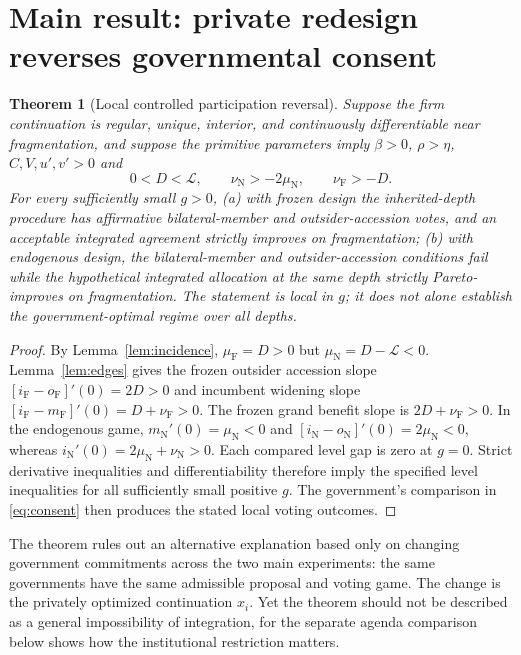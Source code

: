 \documentclass[11pt,a4paper]{article}
\newtheorem{theorem}{Theorem}
\theoremstyle{remark}\newtheorem{remark}[theorem]{Remark}
\newcommand{\N}{\mathrm{N}}\newcommand{\F}{\mathrm{F}}
\newcommand{\loss}{\mathcal L}\newcommand{\vect}[1]{\boldsymbol{#1}}
\begin{document}
\section{Main result: private redesign reverses governmental consent}\label{sec:global}
\begin{theorem}[Local controlled participation reversal]\label{thm:local}
Suppose the firm continuation is regular, unique, interior, and continuously differentiable near fragmentation, and suppose the primitive parameters imply $\beta>0$, $\rho>\eta$, $C,V,u',v'>0$ and
\begin{equation}\label{eq:conditions}
0<D<\loss,\qquad \nu_{\N}>-2\mu_{\N},\qquad \nu_{\F}>-D.
\end{equation}
For every sufficiently small $g>0$, (a) with frozen design the inherited-depth procedure has affirmative bilateral-member and outsider-accession votes, and an acceptable integrated agreement strictly improves on fragmentation; (b) with endogenous design, the bilateral-member and outsider-accession conditions fail while the hypothetical integrated allocation at the same depth strictly Pareto-improves on fragmentation. The statement is local in $g$; it does not alone establish the government-optimal regime over all depths.
\end{theorem}
\begin{proof}
By Lemma~\ref{lem:incidence}, $\mu_{\F}=D>0$ but $\mu_{\N}=D-\loss<0$. Lemma~\ref{lem:edges} gives the frozen outsider accession slope $[i_{\F}-o_{\F}]'(0)=2D>0$ and incumbent widening slope $[i_{\F}-m_{\F}]'(0)=D+\nu_{\F}>0$. The frozen grand benefit slope is $2D+\nu_{\F}>0$. In the endogenous game, $m_{\N}'(0)=\mu_{\N}<0$ and $[i_{\N}-o_{\N}]'(0)=2\mu_{\N}<0$, whereas $i_{\N}'(0)=2\mu_{\N}+\nu_{\N}>0$. Each compared level gap is zero at $g=0$. Strict derivative inequalities and differentiability therefore imply the specified level inequalities for all sufficiently small positive $g$. The government's comparison in \eqref{eq:consent} then produces the stated local voting outcomes.
\end{proof}

The theorem rules out an alternative explanation based only on changing government commitments across the two main experiments: the same governments have the same admissible proposal and voting game. The change is the privately optimized continuation $x_i$. Yet the theorem should not be described as a general impossibility of integration, for the separate agenda comparison below shows how the institutional restriction matters.
\end{document}
